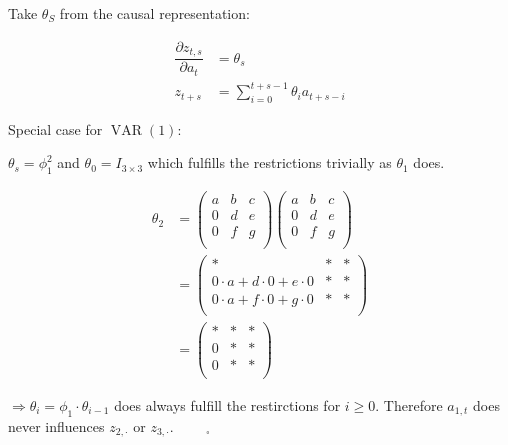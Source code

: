 \documentclass[12pt,a4paper]{article}
\newcommand{\VAR}{\operatorname{VAR}} %
\begin{document}
Take \(\theta_S\) from the causal representation:

\begin{align*}
  \dfrac{\partial z_{t,s}}{\partial a_t} & = \theta_s \\
  z_{t + s} & = \sum_{i = 0}^{t + s -1} \theta_i a_{t + s -i}
\end{align*}

Special case for \(\VAR(1)\):

\(\theta_s = \phi_1^{2}\) and \(\theta_0 = I_{3 \times 3}\) which
fulfills the restrictions trivially as \(\theta_1\) does.

\begin{align*}
\theta_2 & = \begin{pmatrix} 
  a & b & c \\
  0 & d & e \\
  0 & f & g \\
  \end{pmatrix} \begin{pmatrix} 
  a & b & c \\
  0 & d & e \\
  0 & f & g \\
  \end{pmatrix} \\
  & = 
  \begin{pmatrix} 
  \ast & \ast & \ast \\
  0 \cdot a + d \cdot 0 + e \cdot 0 & \ast & \ast \\
  0 \cdot a + f \cdot 0 + g \cdot 0 & \ast & \ast \\
  \end{pmatrix}\\
  & = 
  \begin{pmatrix} 
  \ast    & \ast & \ast \\
  0       & \ast & \ast \\
  0       & \ast & \ast \\
  \end{pmatrix}
\end{align*}

\(\Rightarrow \theta_i = \phi_1 \cdot \theta_{i -1}\) does always
fulfill the restirctions for \(i \geq 0\). Therefore \(a_{1,t}\) does
never influences \(z_{2, \cdot}\) or \(z_{3, \cdot}\).
\(\qquad _{\square}\)
\end{document}

